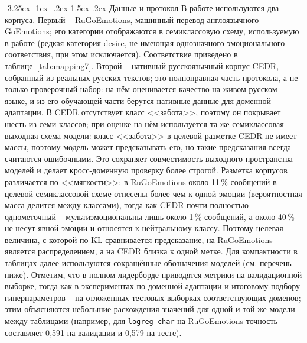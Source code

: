 \documentclass[12pt,a4paper]{report}
\makeatletter
\renewcommand{\subsection}{\@startsection{subsection}{2}{\z@}%
  {-3.25ex \@plus -1ex \@minus -.2ex}%
  {1.5ex \@plus .2ex}%
  {\normalfont\large\bfseries\centering}}
\makeatother
\begin{document}
\subsection{Данные и протокол}
В работе используются два корпуса. Первый -- RuGoEmotions, машинный перевод англоязычного GoEmotions; его категории отображаются в семиклассовую схему, используемую в работе (редкая категория desire, не имеющая однозначного эмоционального соответствия, при этом исключается). Соответствие приведено в таблице~\ref{tab:mapping7}. Второй -- нативный русскоязычный корпус CEDR, собранный из реальных русских текстов; это полноправная часть протокола, а не только проверочный набор: на нём оценивается качество на живом русском языке, и из его обучающей части берутся нативные данные для доменной адаптации. В CEDR отсутствует класс <<забота>>, поэтому он покрывает шесть из семи классов; при оценке на нём используется та же семиклассовая выходная схема модели: класс <<забота>> в целевой разметке CEDR не имеет массы, поэтому модель может предсказывать его, но такие предсказания всегда считаются ошибочными. Это сохраняет совместимость выходного пространства моделей и делает кросс-доменную проверку более строгой. Разметка корпусов различается по <<мягкости>>: в RuGoEmotions около 11\,\% сообщений в целевой семиклассовой схеме отнесены более чем к одной эмоции (вероятностная масса делится между классами), тогда как CEDR почти полностью однометочный -- мультиэмоциональны лишь около 1\,\% сообщений, а около 40\,\% не несут явной эмоции и относятся к нейтральному классу. Поэтому целевая величина, с которой по KL сравнивается предсказание, на RuGoEmotions является распределением, а на CEDR близка к одной метке. Для компактности в таблицах далее используются сокращённые обозначения моделей (см. перечень ниже). Отметим, что в полном лидерборде приводятся метрики на валидационной выборке, тогда как в экспериментах по доменной адаптации и итоговому подбору гиперпараметров -- на отложенных тестовых выборках соответствующих доменов; этим объясняются небольшие расхождения значений для одной и той же модели между таблицами (например, для \texttt{logreg-char} на RuGoEmotions точность составляет 0{,}591 на валидации и 0{,}579 на тесте).
\end{document}

